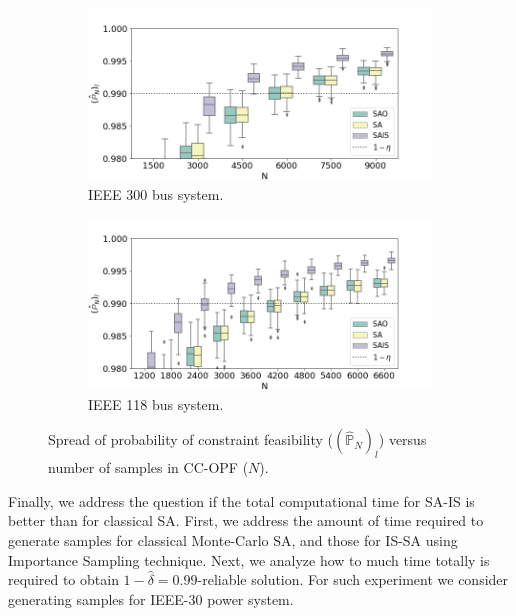 \begin{figure}[hbt]
\centering
\begin{subfigure}{.8\textwidth}
  \centering
  \includegraphics[width=0.99\linewidth]{Dissertation/images/dc_stochastic_approx/case300/boxplot_J_N_9000_eta_001.png}
  \caption{IEEE 300 bus system.}
  \label{fig:ieee300conservatism-dc}
\end{subfigure}

\begin{subfigure}{.8\textwidth}
  \centering
  \includegraphics[width=0.99\linewidth]{Dissertation/images/dc_stochastic_approx/ieee118/boxplot_J_N_6600_eta_001.png}
  \caption{IEEE 118 bus system.}
  \label{fig:ieee118conservatism-dc}
\end{subfigure}
\caption{Spread of probability of constraint feasibility ($(\hat{\mathbb{P}}_N)_l$) versus number of samples in CC-OPF ($N$).}
\label{fig:spreads-dc}
\end{figure}

Finally, we address the question if the total computational time for SA-IS is better than for classical SA. First, we address the amount of time required to generate samples for classical Monte-Carlo SA, and those for IS-SA using Importance Sampling technique. Next, we analyze how to much time totally is required to obtain $1-\hat{\delta}=0.99$-reliable solution. For such experiment we consider generating samples for IEEE-30 power system. 

